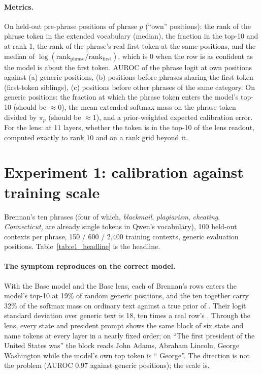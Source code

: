 \documentclass[11pt]{article}
\begin{document}
\paragraph{Metrics.}
On held-out pre-phrase positions of phrase $p$ (``own'' positions): the rank of the phrase token in the extended vocabulary (median), the fraction in the top-10 and at rank 1, the rank of the phrase's real first token at the same positions, and the median of $\log(\mathrm{rank}_{\mathrm{phrase}}/\mathrm{rank}_{\mathrm{first}})$, which is $0$ when the row is as confident as the model is about the first token. AUROC of the phrase logit at own positions against (a) generic positions, (b) positions before phrases sharing the first token (first-token siblings), (c) positions before other phrases of the same category. On generic positions: the fraction at which the phrase token enters the model's top-10 (should be $\approx 0$), the mean extended-softmax mass on the phrase token divided by $\pi_p$ (should be $\approx 1$), and a prior-weighted expected calibration error. For the lens: at 11 layers, whether the token is in the top-10 of the lens readout, computed exactly to rank 10 and on a rank grid beyond it.

\section{Experiment 1: calibration against training scale}
\label{sec:e1}
Brennan's ten phrases (four of which, \emph{blackmail}, \emph{plagiarism}, \emph{cheating}, \emph{Connecticut}, are already single tokens in Qwen's vocabulary), 100 held-out contexts per phrase, 150 / 600 / 2{,}400 training contexts, \EoneGenericEval{} generic evaluation positions. Table~\ref{tab:e1_headline} is the headline.



\paragraph{The symptom reproduces on the correct model.}
With the Base model and the Base lens, each of Brennan's rows enters the model's top-10 at 19\% of random generic positions, and the ten together carry 32\% of the softmax mass on ordinary text against a true prior of \EonePriorSum{}. Their logit standard deviation over generic text is 18, ten times a real row's \EoneWuStd{}. Through the lens, every state and president prompt shows the same block of six state and name tokens at every layer in a nearly fixed order; on ``The first president of the United States was'' the block reads John Adams, Abraham Lincoln, George Washington while the model's own top token is `` George''. The direction is not the problem (AUROC 0.97 against generic positions); the scale is.
\end{document}
